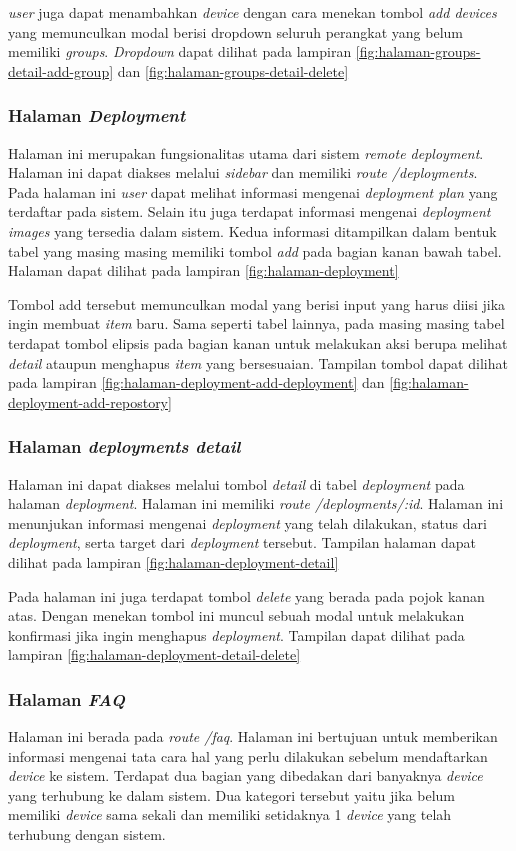 \textit{user} juga dapat menambahkan \textit{device} dengan cara menekan tombol \textit{add devices} yang memunculkan modal berisi dropdown seluruh perangkat yang belum memiliki \textit{groups}. \textit{Dropdown} dapat dilihat pada lampiran \ref{fig:halaman-groups-detail-add-group} dan \ref{fig:halaman-groups-detail-delete}

\subsubsection{Halaman \textit{Deployment}}
Halaman ini merupakan fungsionalitas utama dari sistem \textit{remote deployment}. Halaman ini dapat diakses melalui \textit{sidebar} dan memiliki \textit{route /deployments}. Pada halaman ini \textit{user} dapat melihat informasi mengenai \textit{deployment plan} yang terdaftar pada sistem. Selain itu juga terdapat informasi mengenai \textit{deployment images} yang tersedia dalam sistem. Kedua informasi ditampilkan dalam bentuk tabel yang masing masing memiliki tombol \textit{add} pada bagian kanan bawah tabel. Halaman dapat dilihat pada lampiran \ref{fig:halaman-deployment}

Tombol add tersebut memunculkan modal yang berisi input yang harus diisi jika ingin membuat \textit{item} baru. Sama seperti tabel lainnya, pada masing masing tabel terdapat tombol elipsis pada bagian kanan untuk melakukan aksi berupa melihat \textit{detail} ataupun menghapus \textit{item} yang bersesuaian. Tampilan tombol dapat dilihat pada lampiran \ref{fig:halaman-deployment-add-deployment} dan \ref{fig:halaman-deployment-add-repostory}

\subsubsection{Halaman \textit{deployments detail}}
Halaman ini dapat diakses melalui tombol \textit{detail} di tabel \textit{deployment} pada halaman \textit{deployment}. Halaman ini memiliki \textit{route /deployments/:id}. Halaman ini menunjukan informasi mengenai \textit{deployment} yang telah dilakukan, status dari \textit{deployment}, serta target dari \textit{deployment} tersebut. Tampilan halaman dapat dilihat pada lampiran \ref{fig:halaman-deployment-detail}

Pada halaman ini juga terdapat tombol \textit{delete} yang berada pada pojok kanan atas. Dengan menekan tombol ini muncul sebuah modal untuk melakukan konfirmasi jika ingin menghapus \textit{deployment}. Tampilan dapat dilihat pada lampiran \ref{fig:halaman-deployment-detail-delete}

\subsubsection{Halaman \textit{FAQ}}
Halaman ini berada pada \textit{route /faq}. Halaman ini bertujuan untuk memberikan informasi mengenai tata cara hal yang perlu dilakukan sebelum mendaftarkan \textit{device} ke sistem. Terdapat dua bagian yang dibedakan dari banyaknya \textit{device} yang terhubung ke dalam sistem. Dua kategori tersebut yaitu jika belum memiliki \textit{device} sama sekali dan memiliki setidaknya 1 \textit{device} yang telah terhubung dengan sistem.
